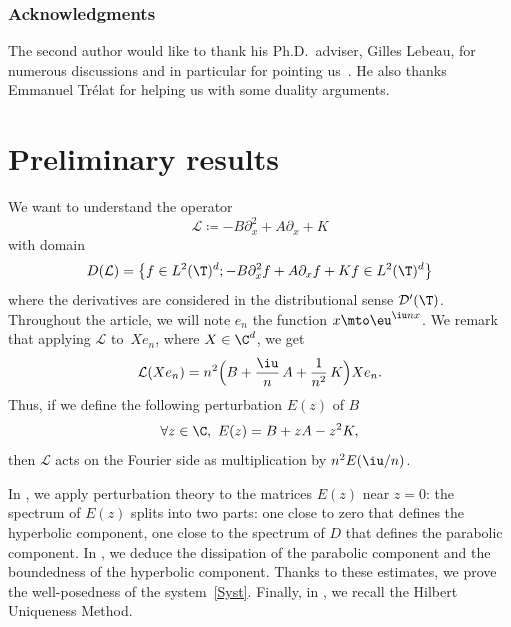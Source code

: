 \subsubsection*{Acknowledgments}
The second author would like to thank his Ph.D.\ adviser, Gilles Lebeau, for numerous discussions and in particular for pointing us~\cite{lebeau_1998}. He also thanks Emmanuel Trélat for helping us with some duality arguments.

\section{Preliminary results} \label{Sec:Prel}

We want to understand the operator\vspace*{-3pt}
\begin{equation} \label{defL}
\mathcal{L} \coloneqq -B\partial_{x}^2 + A \partial_{x} + K
\end{equation}
with domain\vspace*{-3pt}\enlargethispage{\baselineskip}%
\begin{equation} \label{def:D(L)}
D(\mathcal{L})=\left\{ f \in L^2(\T)^d ; -B\partial_{x}^2f + A \partial_{x}f + K f \in L^2(\T)^d \right\}
\end{equation}
where the derivatives are considered in the distributional sense $\mathcal{D}'(\T)$.
Throughout the article, we will note $e_n$ the function $x\mto \eu^{\iu nx}$.
We remark that applying $\mathcal L$ to~$X e_n$, where $X \in \C^{d}$, we get\vspace*{-3pt}
\begin{equation}
\label{FourierOp}
\mathcal L (X e_n) = n^{2}\Bigl(B +\frac{\iu}{n}\, A + \frac{1}{n^{2}}\,K\Bigr)X e_n.
\end{equation}
Thus, if we define the following perturbation $E(z)$ of $B$\vspace*{-3pt}
\begin{equation}
\label{defBh}
\forall z \in \C,\ E(z) = B + z A - z^{2} K,
\end{equation}
then $\mathcal L$ acts on the Fourier side as multiplication by $n^2E(\iu /n)$.

In , we apply perturbation theory to the matrices $E(z)$ near $z=0$: the spectrum of $E(z)$ splits into two parts: one close to zero that defines the hyperbolic component, one close to the spectrum of $D$ that defines the parabolic component. In , we deduce the dissipation of the parabolic component and the boundedness of the hyperbolic component. Thanks to these estimates, we prove the well-posedness of the system~\eqref{Syst}. Finally, in , we recall the Hilbert Uniqueness Method.


